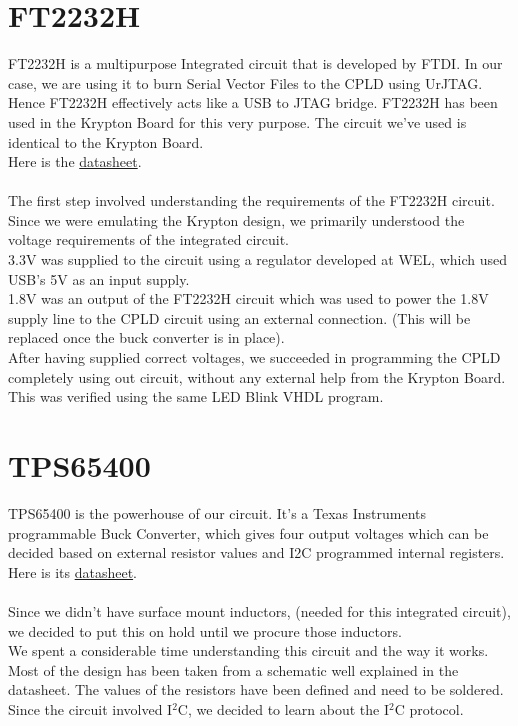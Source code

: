 \documentclass[11pt]{article}
\begin{document}
\section{FT2232H}
FT2232H is a multipurpose Integrated circuit that is developed by FTDI. In our case, we are using it to burn Serial Vector Files to the CPLD using UrJTAG. Hence FT2232H effectively acts like a USB to JTAG bridge. FT2232H has been used in the Krypton Board for this very purpose. The circuit we've used is identical to the Krypton Board.\\
Here is the \href{http://www.ftdichip.com/Support/Documents/DataSheets/ICs/DS_FT2232H.pdf}{datasheet}.\\\\ 
The first step involved understanding the requirements of the FT2232H circuit. Since we were emulating the Krypton design, we primarily understood the voltage requirements of the integrated circuit.\\
3.3V was supplied to the circuit using a regulator developed at WEL, which used USB's 5V as an input supply.\\
1.8V was an output of the FT2232H circuit which was used to power the 1.8V supply line to the CPLD circuit using an external connection. (This will be replaced once the buck converter is in place).\\
After having supplied correct voltages, we succeeded in programming the CPLD completely using out circuit, without any external help from the Krypton Board. This was verified using the same LED Blink VHDL program.

\section{TPS65400}
TPS65400 is the powerhouse of our circuit. It's a Texas Instruments programmable Buck Converter, which gives four output voltages which can be decided based on external resistor values and I2C programmed internal registers.\\ Here is its \href{http://www.ti.com/lit/ds/symlink/tps65400.pdf}{datasheet}.\\\\
Since we didn't have surface mount inductors, (needed for this integrated circuit), we decided to put this on hold until we procure those inductors.\\
We spent a considerable time understanding this circuit and the way it works.
Most of the design has been taken from a schematic well explained in the datasheet. The values of the resistors have been defined and need to be soldered. Since the circuit involved I$^2$C, we decided to learn about the I$^2$C protocol.
\end{document}
